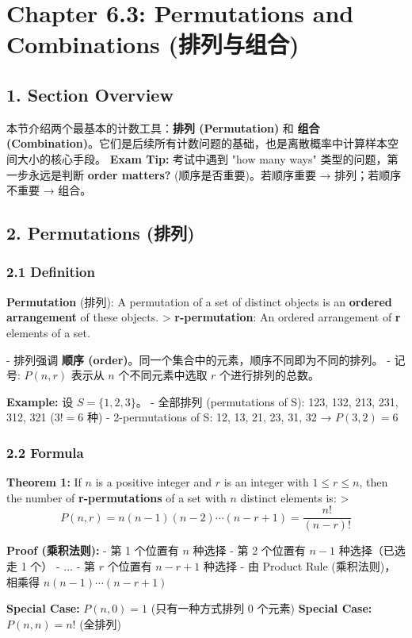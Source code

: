\documentclass[10pt,a4paper,openany]{ctexbook}
\theoremstyle{definition}
\theoremstyle{remark}
\renewenvironment{quote}
  {\list{}{\leftmargin=1em\rightmargin=0pt\topsep=0.5pt\partopsep=0pt}\item[]}
  {\endlist}
\begin{document}
\section{Chapter 6.3: Permutations and Combinations (排列与组合)}

\vspace{-2pt}

\subsection{1. Section Overview}

本节介绍两个最基本的计数工具：\textbf{排列 (Permutation)} 和 \textbf{组合 (Combination)}。它们是后续所有计数问题的基础，也是离散概率中计算样本空间大小的核心手段。
\textbf{Exam Tip:} 考试中遇到 "how many ways" 类型的问题，第一步永远是判断 \textbf{order matters?} (顺序是否重要)。若顺序重要 → 排列；若顺序不重要 → 组合。
\vspace{-2pt}

\subsection{2. Permutations (排列)}

\subsubsection{2.1 Definition}

\begin{quote}
\textbf{Permutation} (排列): A permutation of a set of distinct objects is an \textbf{ordered arrangement} of these objects.
>
\textbf{r-permutation}: An ordered arrangement of \textbf{r} elements of a set.

- 排列强调 \textbf{顺序 (order)}。同一个集合中的元素，顺序不同即为不同的排列。
- 记号: $P(n, r)$ 表示从 $n$ 个不同元素中选取 $r$ 个进行排列的总数。

\textbf{Example:}
设 $S = \{1, 2, 3\}$。
- 全部排列 (permutations of S): 123, 132, 213, 231, 312, 321 ($3! = 6$ 种)
- 2-permutations of S: 12, 13, 21, 23, 31, 32 → $P(3,2) = 6$

\end{quote}

\subsubsection{2.2 Formula}

\begin{quote}
\textbf{Theorem 1:} If $n$ is a positive integer and $r$ is an integer with $1 \le r \le n$, then the number of \textbf{r-permutations} of a set with $n$ distinct elements is:
>
\[
P(n, r) = n(n-1)(n-2)\cdots(n-r+1) = \frac{n!}{(n-r)!}
\]


\textbf{Proof (乘积法则):}
- 第 1 个位置有 $n$ 种选择
- 第 2 个位置有 $n-1$ 种选择（已选走 1 个）
- ...
- 第 $r$ 个位置有 $n-r+1$ 种选择
- 由 Product Rule (乘积法则)，相乘得 $n(n-1)\cdots(n-r+1)$

\textbf{Special Case:} $P(n, 0) = 1$ (只有一种方式排列 0 个元素)
\textbf{Special Case:} $P(n, n) = n!$ (全排列)

\end{quote}
\vspace{-2pt}
\end{document}
